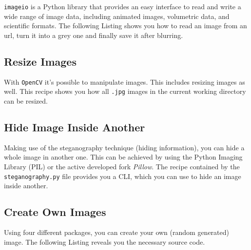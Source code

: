 \lstinline{imageio} is a Python library that provides an easy interface to read and write a wide range of image data, including animated images, volumetric data, and scientific formats.
The following Listing shows you how to read an image from an url, turn it into a grey one and finally save it after blurring.




\subsection{Resize Images}

With \lstinline{OpenCV} it's possible to manipulate images.
This includes resizing images as well.
This recipe shows you how all \lstinline{.jpg} images in the current working directory can be resized.




\subsection{Hide Image Inside Another}

Making use of the steganography technique (hiding information), you can hide a whole image in another one.
This can be achieved by using the Python Imaging Library (PIL) or the active developed fork \textit{Pillow}.
The recipe contained by the \lstinline{steganography.py} file provides you a CLI, which you can use to hide an image inside another.


\subsection{Create Own Images}

Using four different packages, you can create your own (random generated) image.
The following Listing reveals you the necessary source code.



